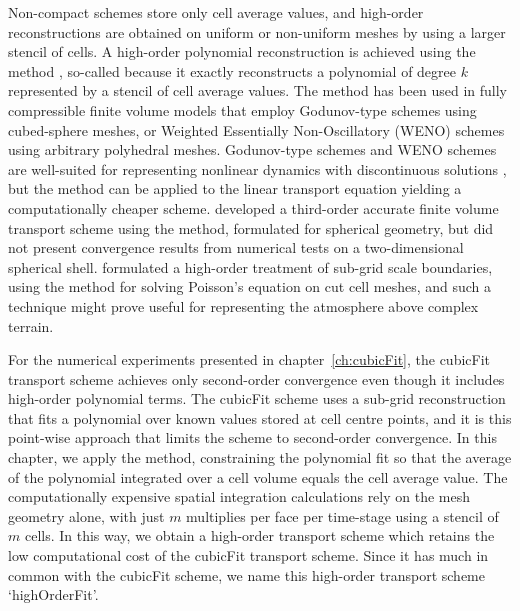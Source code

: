 Non-compact schemes store only cell average values, and high-order reconstructions are obtained on uniform or non-uniform meshes by using a larger stencil of cells.
A high-order polynomial reconstruction is achieved using the \kexact{} method \citep{barth1995}, so-called because it exactly reconstructs a polynomial of degree $k$ represented by a stencil of cell average values.
The \kexact{} method has been used in fully compressible finite volume models that employ Godunov-type schemes \citep{ullrich-jablonowski2012} using cubed-sphere meshes, or Weighted Essentially Non-Oscillatory (WENO) schemes \citep{tsoutsanis-drikakis2016} using arbitrary polyhedral meshes.
Godunov-type schemes and WENO schemes are well-suited for representing nonlinear dynamics with discontinuous solutions \citep{leveque2002}, but the \kexact{} method can be applied to the linear transport equation yielding a computationally cheaper scheme.
\citet{sjoegreen2012} developed a third-order accurate finite volume transport scheme using the \kexact{} method, formulated for spherical geometry, but did not present convergence results from numerical tests on a two-dimensional spherical shell.
\citet{schwartz2015} formulated a high-order treatment of sub-grid scale boundaries, using the \kexact{} method for solving Poisson's equation on cut cell meshes, and such a technique might prove useful for representing the atmosphere above complex terrain.

For the numerical experiments presented in chapter~\ref{ch:cubicFit}, the cubicFit transport scheme achieves only second-order convergence even though it includes high-order polynomial terms.
The cubicFit scheme uses a sub-grid reconstruction that fits a polynomial over known values stored at cell centre points, and it is this point-wise approach that limits the scheme to second-order convergence.
In this chapter, we apply the \kexact{} method, constraining the polynomial fit so that the average of the polynomial integrated over a cell volume equals the cell average value.
The computationally expensive spatial integration calculations rely on the mesh geometry alone, with just $m$ multiplies per face per time-stage using a stencil of $m$ cells.
In this way, we obtain a high-order transport scheme which retains the low computational cost of the cubicFit transport scheme.
Since it has much in common with the cubicFit scheme, we name this high-order transport scheme `highOrderFit'.

